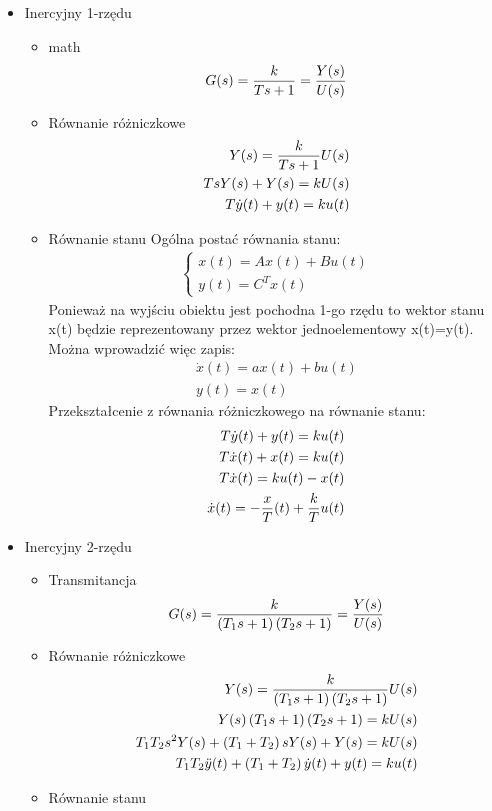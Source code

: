 \documentclass[a4paper,10pt]{article}
\begin{document}
\begin{itemize}
\item Inercyjny 1-rzędu

\begin{itemize}
\item math	
	\begin{eqnarray}
		G(s)= {k \over {Ts + 1}} = {Y(s) \over U(s)}
	\end{eqnarray}
\item Równanie różniczkowe
	\begin{eqnarray}
		Y(s) = {k \over {Ts + 1}} U(s)\\
		\nonumber TsY(s) + Y(s) = kU(s)\\
		\nonumber T\dot{y}(t) + y(t) = ku(t)
	\end{eqnarray}
\item Równanie stanu
\newline Ogólna postać równania stanu: %
	\begin{eqnarray}
		\left\{
			\begin{array}{l}
				x(t) = Ax(t) + Bu(t)\\
				y(t) = C^{T}x(t)
			\end{array} \right.
	\end{eqnarray}
Ponieważ na wyjściu obiektu jest pochodna 1-go rzędu to wektor stanu x(t) będzie reprezentowany przez wektor jednoelementowy x(t)=y(t). Można wprowadzić więc zapis:
	\begin{eqnarray}
		\dot{x}(t) = ax(t) + bu(t)\\
		\nonumber y(t) = x(t)
	\end{eqnarray}
Przekształcenie z równania różniczkowego na równanie stanu: %
	\begin{eqnarray}
		T\dot{y}(t) + y(t) = ku(t)\\
		\nonumber T\dot{x}(t) + x(t) = ku(t)\\
		\nonumber T\dot{x}(t) = ku(t) - x(t)\\
		\nonumber \dot{x}(t) = -{x \over T}(t) + {k \over T}u(t)
	\end{eqnarray}
\end{itemize}

\item Inercyjny 2-rzędu
\begin{itemize}
\item Transmitancja
	\begin{eqnarray}
		G(s)= {k \over \left({T_{1}s + 1}\right) \left({T_{2}s + 1}\right)} = {Y(s) \over U(s)}
	\end{eqnarray}
\item Równanie różniczkowe
	\begin{eqnarray}
		Y(s) = {k \over {\left({T_{1}s + 1}\right) \left({T_{2}s + 1}\right)}} U(s)\\
		\nonumber Y(s)\left({T_{1}s + 1}\right) \left({T_{2}s + 1}\right)= kU(s)\\
		\nonumber T_{1}T_{2}s^{2}Y(s) + \left({T_{1} + T_{2}}\right) s Y(s) + Y(s)= kU(s)\\
		\nonumber T_{1}T_{2}\ddot{y}(t) + \left({T_{1} + T_{2}}\right) \dot{y}(t) + y(t)= k u(t)
	\end{eqnarray}
\item Równanie stanu


\end{itemize}
\end{itemize}
\end{document}
